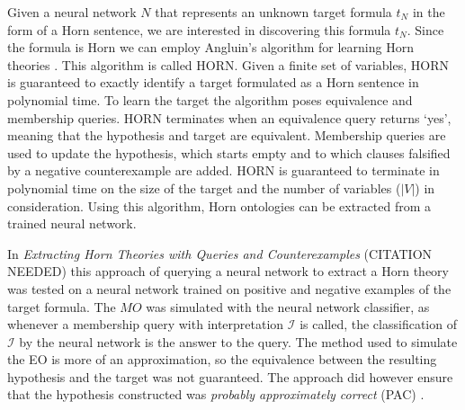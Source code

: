 Given a neural network $N$ that represents an unknown target formula $t_N$ in the form of a Horn sentence, we are interested in discovering this formula $t_N$. Since the formula is Horn we can employ Angluin's algorithm for learning Horn theories \cite{DBLP:journals/ml/AngluinFP92}. This algorithm is called HORN. Given a finite set of variables, HORN is guaranteed to exactly identify a target formulated as a Horn sentence in polynomial time. To learn the target the algorithm poses equivalence and membership queries. HORN terminates when an equivalence query returns `yes', meaning that the hypothesis and target are equivalent. Membership queries are used to update the hypothesis, which starts empty and to which clauses falsified by a negative counterexample are added. HORN is guaranteed to terminate in polynomial time on the size of the target and the number of variables ($|V|$) in consideration. Using this algorithm, Horn ontologies can be extracted from a trained neural network.

In \emph{Extracting Horn Theories with Queries and Counterexamples} (CITATION NEEDED) this approach of querying a neural network to extract a Horn theory was tested on a neural network trained on positive and negative examples of the target formula. The $MO$ was simulated with the neural network classifier, as whenever a membership query with interpretation $\mathcal{I}$ is called, the classification of $\mathcal{I}$ by the neural network is the answer to the query. The method used to simulate the EO is more of an approximation, so the equivalence between the resulting hypothesis and the target was not guaranteed. The approach did however ensure that the hypothesis constructed was \emph{probably approximately correct} (PAC) \cite{Valiant}.

